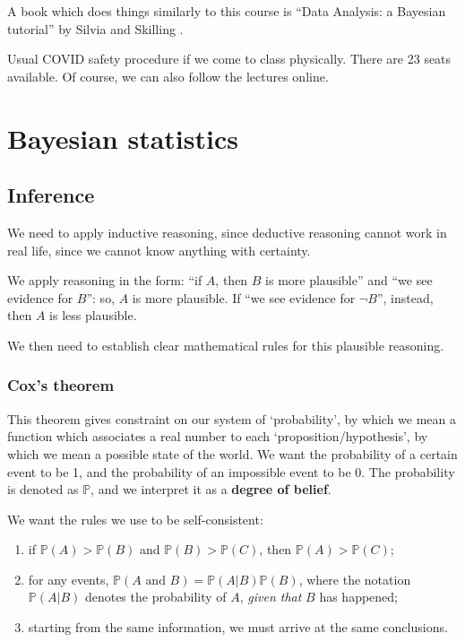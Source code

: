 \documentclass[main.tex]{subfiles}
\begin{document}
A book which does things similarly to this course is ``Data Analysis: a Bayesian tutorial'' by Silvia and Skilling \cite[]{siviaDataAnalysisBayesian2006}. 

Usual COVID safety procedure if we come to class physically.
There are 23 seats available.
Of course, we can also follow the lectures online. 

\chapter{Bayesian statistics}

\section{Inference}

We need to apply inductive reasoning, since deductive reasoning cannot work in real life, since we cannot know anything with certainty.

We apply reasoning in the form: ``if \(A\), then \(B\) is more plausible''  and ``we see evidence for \(B\)'': so, \(A\) is more plausible.
If ``we see evidence for \(\neg B\)'', instead, then \(A\) is less plausible. 

We then need to establish clear mathematical rules for this plausible reasoning. 

\subsection{Cox's theorem}

This theorem gives constraint on our system of `probability', by which we mean a function which associates a real number to each `proposition/hypothesis', by which we mean a possible state of the world.
We want the probability of a certain event to be 1, and the probability of an impossible event to be 0. The probability is denoted as \(\mathbb{P}\), and we interpret it as a \textbf{degree of belief}.

We want the rules we use to be self-consistent: 
\begin{enumerate}
    \item if \(\mathbb{P}(A) > \mathbb{P}(B)\) and \(\mathbb{P}(B) > \mathbb{P}(C)\), then \(\mathbb{P}(A) > \mathbb{P}(C)\);
    \item for any events, \(\mathbb{P}(A \text{ and } B) = \mathbb{P}(A | B) \mathbb{P}(B)\), where the notation \(\mathbb{P}(A|B)\) denotes the probability of \(A\), \emph{given that} \(B\) has happened;
    \item starting from the same information, we must arrive at the same conclusions.  
\end{enumerate}
\end{document}
